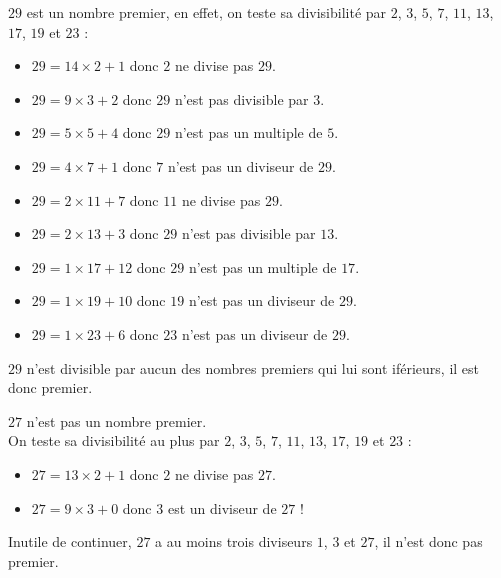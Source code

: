 \begin{exemple*1}
$29$ est un nombre premier, en effet, on teste sa divisibilité par $2$, $3$, $5$, $7$, $11$, $13$, $17$, $19$ et $23$ :

\medskip
\begin{minipage}{0.48\linewidth}
	\begin{itemize}
		\item $29=14\times 2+1$ donc $2$ ne divise pas $29$.
		\item $29=9\times 3+2$ donc $29$ n'est pas divisible par $3$.
		\item $29=5\times 5+4$ donc $29$ n'est pas un multiple de $5$.
		\item $29=4\times 7+1$ donc $7$ n'est pas un diviseur de $29$.
		\item $29=2\times 11+7$ donc $11$ ne divise pas $29$.
	\end{itemize}
\end{minipage}
\begin{minipage}{0.52\linewidth}
	\begin{itemize}
		\item $29=2\times 13+3$ donc $29$ n'est pas divisible par $13$.
		\item $29=1\times 17+12$ donc $29$ n'est pas un multiple de $17$.
		\item $29=1\times 19+10$ donc $19$ n'est pas un diviseur de $29$.
		\item $29=1\times 23+6$ donc $23$ n'est pas un diviseur de $29$.
	\end{itemize}
\end{minipage}

\medskip
$29$ n'est divisible par aucun des nombres premiers qui lui sont iférieurs, il est donc premier.
\end{exemple*1}

\begin{exemple*1}
	$27$ n'est pas un nombre premier.\\ On teste sa divisibilité au plus par $2$, $3$, $5$, $7$, $11$, $13$, $17$, $19$ et $23$ :
	\begin{itemize}
		\item $27=13\times 2+1$ donc $2$ ne divise pas $27$.
		\item $27=9\times 3+0$ donc 3 est un diviseur de $27$ !
	\end{itemize}
Inutile de continuer, $27$ a au moins trois diviseurs $1$, $3$ et $27$, il n'est donc pas premier.
\end{exemple*1}